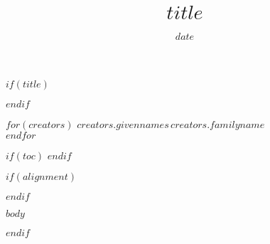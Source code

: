 \documentclass[11pt]{scrartcl}
\title{$title$}
\date{$date$}
\begin{document}
$if(title)$
\maketitle
$endif$

{\small
$for(creators)$
\textsc{$creators.givennames$\,$creators.familyname$}\\
$endfor$
}

$if(toc)$
\tableofcontents
$endif$


$if(alignment)$
\begin{$alignment$}
$endif$

\linenumbers

$body$

\end{$alignment$}
$endif$
\end{document}
